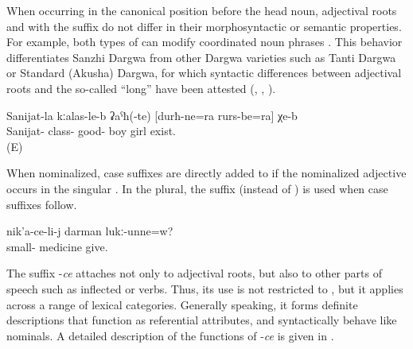 When occurring in the canonical position before the head noun, adjectival roots and  with the suffix  do not differ in their morphosyntactic or semantic properties. For example, both types of  can modify coordinated noun phrases . This behavior differentiates Sanzhi Dargwa from other Dargwa varieties such as Tanti Dargwa or Standard (Akusha) Dargwa, for which syntactic differences between adjectival roots and the so-called ``long''  have been attested (\citealp[26]{vandenBerg2001}, \citealp[207]{AbdullaevEtAl2014}, \citealp{Lander2014}).

\begin{exe}
	\ex	\label{ex:In Sanijats class there are good}
	\gll	Sanijat-la	kːalas-le-b	ʡaˁħ(-te)	[durħ-ne=ra	rurs-be=ra]	χe-b\\
		Sanijat-	class-	good- 	boy\tsc{-pl=add}	girl	exist.\\
	‎\glt	‎‎ (E)
\end{exe}

When nominalized, case suffixes are directly added to  if the nominalized adjective occurs in the singular . In the plural, the suffix  (instead of ) is used when case suffixes follow.

\begin{exe}
	\ex	\label{ex:Does he give medicine to the little one}
	\gll	nik'a-ce-li-j	darman	lukː-unne=w? \\
		small-	medicine	give. \\
	\glt	{}
\end{exe}


The suffix -\textit{ce} attaches not only to adjectival roots, but also to other parts of speech such as inflected  or verbs. Thus, its use is not restricted to , but it applies across a range of lexical categories. Generally speaking, it forms definite descriptions that function as referential attributes, and syntactically behave like nominals. A detailed description of the functions of -\textit{ce} is given in .

